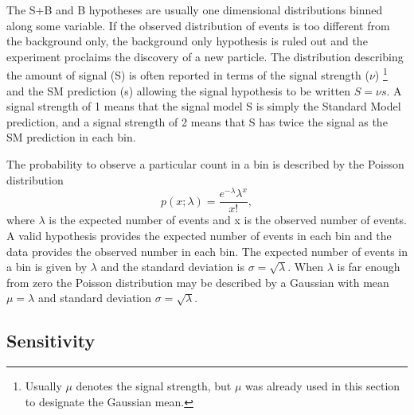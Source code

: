 \documentclass[12pt]{article}
\begin{document}
The S+B and B hypotheses are usually one dimensional distributions binned along some variable. If the observed distribution of events is too different from the background only, the background only hypothesis is ruled out and the experiment proclaims the discovery of a new particle. The distribution describing the amount of signal (S) is often reported in terms of the signal strength ($\nu$) \footnote{Usually $\mu$ denotes the signal strength, but $\mu$ was already used in this section to designate the Gaussian mean.} and the SM prediction (s) allowing the signal hypothesis to be written $S = \nu s$. A signal strength of 1 means that the signal model S is simply the Standard Model prediction, and a signal strength of 2 means that S has twice the signal as the SM prediction in each bin.  

The probability to observe a particular count in a bin is described by the Poisson distribution
\begin{equation}
p\left( x; \lambda \right) = \frac{{e^{ - \lambda } \lambda^x }}{{x!}},
\end{equation}
where $\lambda$ is the expected number of events and x is the observed number of events. A valid hypothesis provides the expected number of events in each bin and the data provides the observed number in each bin. The expected number of events in a bin is given by $\lambda$ and the standard deviation is $\sigma = \sqrt{\lambda}$. When $\lambda$ is far enough from zero the Poisson distribution may be described by a Gaussian with mean $\mu = \lambda$ and standard deviation $\sigma = \sqrt{\lambda}$.  

\subsection{Sensitivity}
\label{sensitivity}
\end{document}
